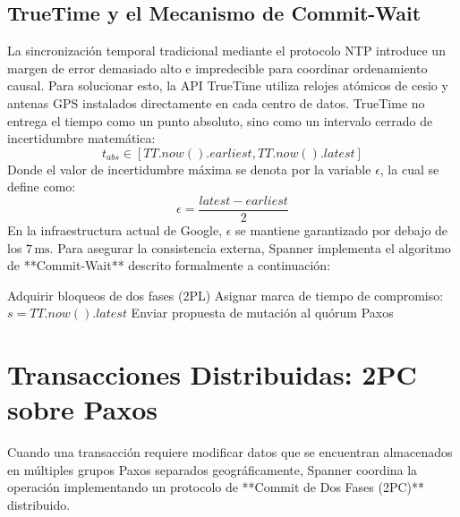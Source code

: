 \documentclass[11pt,a4paper]{article}
\begin{document}
\subsection{TrueTime y el Mecanismo de Commit-Wait}
La sincronización temporal tradicional mediante el protocolo NTP introduce un margen de error demasiado alto e impredecible para coordinar ordenamiento causal. Para solucionar esto, la API TrueTime utiliza relojes atómicos de cesio y antenas GPS instalados directamente en cada centro de datos. TrueTime no entrega el tiempo como un punto absoluto, sino como un intervalo cerrado de incertidumbre matemática:
\begin{equation}
t_{abs} \in [TT.now().earliest, TT.now().latest]
\end{equation}
Donde el valor de incertidumbre máxima se denota por la variable $\epsilon$, la cual se define como:
\begin{equation}
\epsilon = \frac{latest - earliest}{2}
\end{equation}
En la infraestructura actual de Google, $\epsilon$ se mantiene garantizado por debajo de los $7\,\text{ms}$. Para asegurar la consistencia externa, Spanner implementa el algoritmo de **Commit-Wait** descrito formalmente a continuación:

\begin{algorithm}[H]
 \SetAlgoLined
 Adquirir bloqueos de dos fases (2PL)\;
 Asignar marca de tiempo de compromiso: $s = TT.now().latest$\;
 Enviar propuesta de mutación al quórum Paxos\;
 \;
 \caption{Protocolo de Commit Wait en Google Spanner}
\end{algorithm}

\section{Transacciones Distribuidas: 2PC sobre Paxos}
Cuando una transacción requiere modificar datos que se encuentran almacenados en múltiples grupos Paxos separados geográficamente, Spanner coordina la operación implementando un protocolo de **Commit de Dos Fases (2PC)** distribuido.
\end{document}
